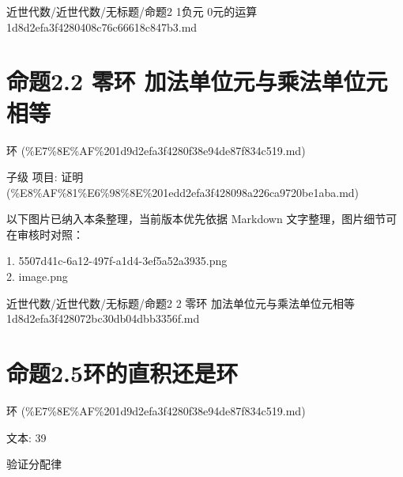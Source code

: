 \begin{note}[来源路径]

近世代数/近世代数/无标题/命题2 1负元 0元的运算 1d8d2efa3f4280408c76c66618c847b3.md

\end{note}

\section*{命题2.2 零环 加法单位元与乘法单位元相等}

\begin{note}[来源上级主题]

环 (\%E7\%8E\%AF\%201d9d2efa3f4280f38e94de87f834c519.md)

\end{note}

\begin{proposition}[命题2.2 零环 加法单位元与乘法单位元相等]

子级 项目: 证明 (\%E8\%AF\%81\%E6\%98\%8E\%201edd2efa3f428098a226ca9720be1aba.md)

\end{proposition}

\begin{note}[关联图片]
以下图片已纳入本条整理，当前版本优先依据 Markdown 文字整理，图片细节可在审核时对照：

1. 5507d41c-6a12-497f-a1d4-3ef5a52a3935.png\\
2. image.png\\

\end{note}

\begin{note}[来源路径]

近世代数/近世代数/无标题/命题2 2 零环 加法单位元与乘法单位元相等 1d8d2efa3f428072bc30db04dbb3356f.md

\end{note}

\section*{命题2.5环的直积还是环}

\begin{note}[来源上级主题]

环 (\%E7\%8E\%AF\%201d9d2efa3f4280f38e94de87f834c519.md)

\end{note}

\begin{proposition}[命题2.5环的直积还是环]

文本: 39

验证分配律

\end{proposition}


